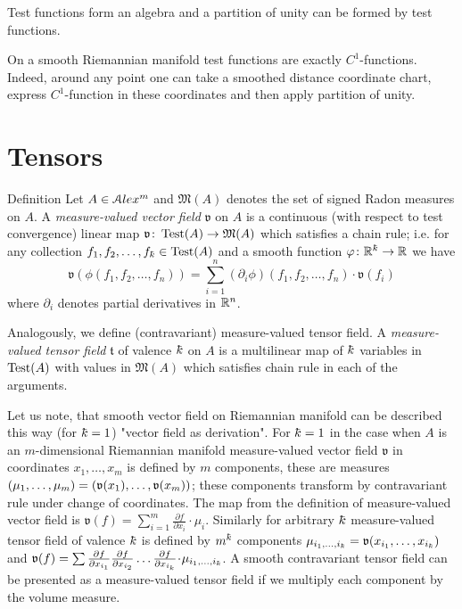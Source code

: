 Test functions form an algebra and a
partition of unity can be formed by test functions.

On a smooth Riemannian manifold test functions
are exactly $C^1$-functions.
Indeed, around any point one can take a
smoothed distance 
coordinate chart, express $C^1$-function in these 
coordinates and then apply partition of unity. 
 
 
\section{Tensors}


\begin{rdef} {Definition}\label{def:mestens}
Let $A\in \mathcal{A}lex^m$ and $\mathfrak M(A)$
denotes the set of signed Radon measures on $A$.
A \emph{measure-valued vector field} $\mathfrak{v}$  on $A$
is a  continuous (with respect to test convergence) linear map
$\mathfrak{v}\colon\operatorname{Test}(A)\to \mathfrak M(A)$ which satisfies a
chain rule;
i.e. for any collection  $f_1,f_2,\dots,f_\kay \in \Test(A)$
and a smooth function $\phi\:\RR^\kay\to\RR$ we have
$$\mathfrak{v}(\phi(f_1,f_2,\dots,f_n))
=
\sum_{i=1}^n (\partial_i\phi)(f_1,f_2,\dots,f_n)\cdot\mathfrak{v}(f_i)$$
where $\partial_i$ denotes partial derivatives in $\mathbb{R}^n$.

Analogously, we define (contravariant) measure-valued tensor field.
A \emph{measure-valued tensor field} $\mathfrak{t}$ of valence $\kay$ on $A$ is a multilinear map of $\kay$ variables in $\operatorname{Test}(A)$ with values in $\mathfrak M(A)$ which satisfies chain rule in each of the arguments.
\end{rdef}

Let us note, that smooth vector field on Riemannian manifold can be described this way (for
$\kay=1$) "vector field as derivation".
For $\kay=1$ in the case when $A$ is an $m$-dimensional Riemannian manifold measure-valued vector field $\mathfrak{v}$  in coordinates
 $x_1,\dots,x_m$
is defined by $m$ components, these are measures $(\mu_1,\dots, \mu_{m})=(\mathfrak{v}(x_1),\dots,\mathfrak{v}(x_m))$;
these components transform by contravariant rule under change
 of coordinates. The map from the definition of measure-valued vector field is
 $\mathfrak{v}(f)=\sum_{i=1}^m\frac{\partial f}{\partial x_i}\cdot \mu_i$.
 Similarly for arbitrary $\kay$ measure-valued tensor field of valence $\kay$ 
 is defined by $m^\kay$ components 
 $\mu_{{i_1},\dots,{i_\kay}}=\vv(x_{i_1},\dots,x_{i_\kay})$
 and
 $\mathfrak{v}(f)=\sum
 \frac{\partial f}{\partial x_{i_1}}\frac{\partial f}{\partial x_{i_2}}\dots\frac{\partial f}{\partial x_{i_k}}
 \cdot \mu_{{i_1},\dots,{i_\kay}}$.
A smooth contravariant tensor field can be presented as a measure-valued tensor field if we multiply each component by the volume measure.

